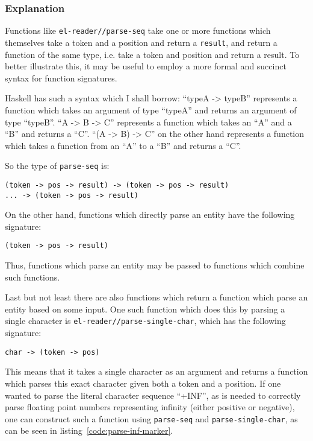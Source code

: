 \documentclass[a4paper,10pt,twoside]{report}
\newcommand{\sym}[1]{\texttt{#1}}
\newcommand{\fun}[1]{\texttt{#1}}
\begin{document}
\subsubsection{Explanation}
\label{subsubsec:parser-explanation}

Functions like \fun{el-reader//parse-seq} take one or more functions which
themselves take a token and a position and return a \sym{result}, and return a
function of the same type, i.e. take a token and position and return a result.
To better illustrate this, it may be useful to employ a more formal and succinct
syntax for function signatures.

Haskell\cite{haskell.org} has such a syntax which I shall borrow: ``typeA ->
typeB'' represents a function which takes an argument of type ``typeA'' and
returns an argument of type ``typeB''.  ``A -> B -> C'' represents a function
which takes an ``A'' and a ``B'' and returns a ``C''.  ``(A -> B) -> C'' on the
other hand represents a function which takes a function from an ``A'' to a ``B''
and returns a ``C''.

So the type of \fun{parse-seq} is:

\begin{lstlisting}[style=lispinline]
(token -> pos -> result) -> (token -> pos -> result)
... -> (token -> pos -> result)
\end{lstlisting}

On the other hand, functions which directly parse an entity have the following
signature:

\begin{lstlisting}[style=lispinline]
(token -> pos -> result)
\end{lstlisting}

Thus, functions which parse an entity may be passed to functions which combine
such functions.

Last but not least there are also functions which return a function which parse
an entity based on some input.  One such function which does this by parsing a
single character is \fun{el-reader//parse-single-char}, which has the following
signature:

\begin{lstlisting}[style=lispinline]
char -> (token -> pos)
\end{lstlisting}

This means that it takes a single character as an argument and returns a
function which parses this exact character given both a token and a position.
If one wanted to parse the literal character sequence ``+INF'', as is needed to
correctly parse floating point numbers representing infinity (either positive or
negative), one can construct such a function using \fun{parse-seq} and
\fun{parse-single-char}, as can be seen in listing~\ref{code:parse-inf-marker}.
\end{document}
